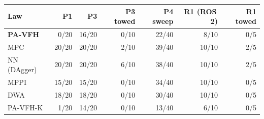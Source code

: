 \scriptsize
\setlength{\tabcolsep}{3pt}
\begin{tabular}{lrrrrrr}
\toprule
Law & P1 & P3 & P3 towed & P4 sweep & R1 (ROS\,2) & R1 towed \\
\midrule
\textbf{PA-VFH} & 0/20 & 16/20 & 0/10 & 22/40 & 8/10 & 0/5 \\
MPC & 20/20 & 20/20 & 2/10 & 39/40 & 10/10 & 2/5 \\
NN (DAgger) & 20/20 & 20/20 & 6/10 & 38/40 & 10/10 & 2/5 \\
MPPI & 15/20 & 15/20 & 0/10 & 34/40 & 10/10 & 0/5 \\
DWA & 18/20 & 18/20 & 0/10 & 30/40 & 10/10 & 0/5 \\
PA-VFH-K & 1/20 & 14/20 & 0/10 & 13/40 & 6/10 & 0/5 \\
\bottomrule
\end{tabular}
